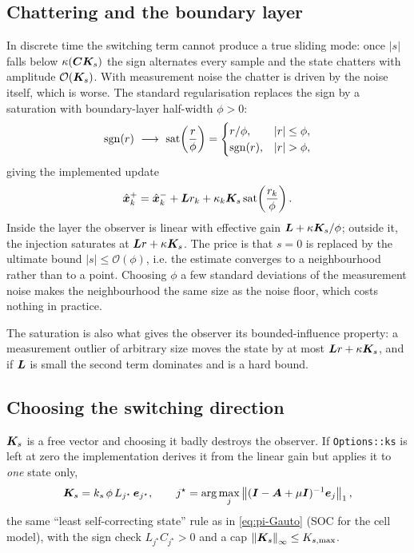 \subsection{Chattering and the boundary layer}
In discrete time the switching term cannot produce a true sliding mode: once $|s|$ falls below
$\kappa(\bm{C}\bm{K}_s)$ the sign alternates every sample and the state chatters with amplitude
$\mathcal{O}(\bm{K}_s)$.  With measurement noise the chatter is driven by the noise itself, which is
worse.  The standard regularisation \cite{utkin1992,slotine1987sliding} replaces the sign by a
saturation with boundary-layer half-width $\phi>0$:
\begin{equation}
\sgn(r)\ \longrightarrow\ \sat\!\left(\frac{r}{\phi}\right)
= \begin{cases} r/\phi, & |r|\le\phi,\\ \sgn(r), & |r|>\phi,\end{cases}
\label{eq:smo-sat}
\end{equation}
giving the implemented update
\begin{equation}
\hat{\bm{x}}^{+}_k = \hat{\bm{x}}^{-}_k + \bm{L} r_k + \kappa_k \bm{K}_s \operatorname{sat}\!\left(\frac{r_k}{\phi}\right) .
\label{eq:smo-update}
\end{equation}
Inside the layer the observer is linear with effective gain $\bm{L} + \kappa\bm{K}_s/\phi$; outside it,
the injection saturates at $\bm{L} r + \kappa\bm{K}_s$.  The price is that $s=0$ is replaced by the
ultimate bound $|s|\le\mathcal{O}(\phi)$, i.e. the estimate converges to a neighbourhood rather
than to a point.  Choosing $\phi$ a few standard deviations of the measurement noise makes the
neighbourhood the same size as the noise floor, which costs nothing in practice.

The saturation is also what gives the observer its bounded-influence property: a measurement
outlier of arbitrary size moves the state by at most $\bm{L} r + \kappa\bm{K}_s$, and if $\bm{L}$ is small
the second term dominates and is a hard bound.

\subsection{Choosing the switching direction}
\label{sec:smo-ks}
$\bm{K}_s$ is a free vector and choosing it badly destroys the observer.  If \texttt{Options::ks} is
left at zero the implementation derives it from the linear gain but applies it to \emph{one}
state only,
\begin{equation}
\bm{K}_s = k_s\,\phi\, L_{j^\star}\,\bm{e}_{j^\star} ,
\qquad j^\star = \arg\max_j \left\lVert (\bm{I}-\bm{A}+\mu\bm{I})^{-1}\bm{e}_j \right\rVert_1 ,
\label{eq:smo-ksauto}
\end{equation}
the same ``least self-correcting state'' rule as in \eqref{eq:pi-Gauto} (SOC for the cell model),
with the sign check $L_{j^\star}C_{j^\star}>0$ and a cap $\left\lVert \bm{K}_s \right\rVert_\infty\le K_{s,\max}$.

